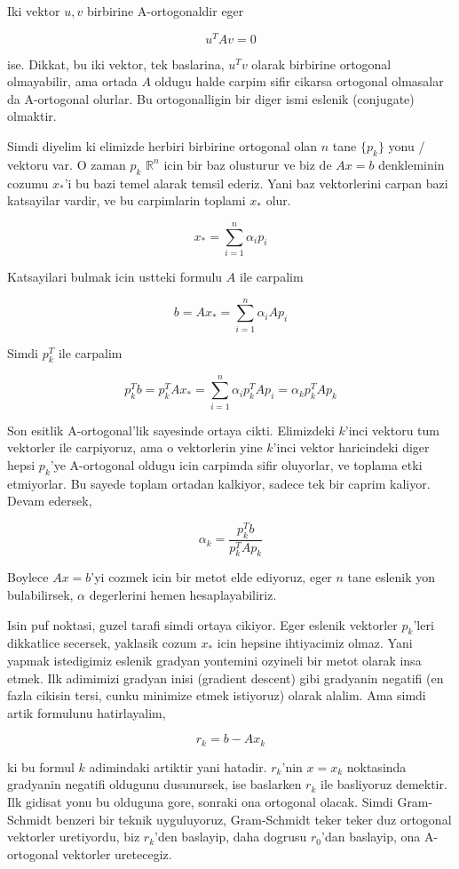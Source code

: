 \documentclass[12pt,fleqn]{article}\usepackage{../common}
\begin{document}
Iki vektor $u,v$ birbirine A-ortogonaldir eger

\[ u^TAv = 0 \] 

ise. Dikkat, bu iki vektor, tek baslarina, $u^Tv$ olarak birbirine
ortogonal olmayabilir, ama ortada $A$ oldugu halde carpim sifir cikarsa
ortogonal olmasalar da A-ortogonal olurlar. Bu ortogonalligin bir diger
ismi eslenik (conjugate) olmaktir.

Simdi diyelim ki elimizde herbiri birbirine ortogonal olan $n$ tane
$\{p_k\}$ yonu / vektoru var. O zaman $p_k$ $\mathbb{R}^n$ icin bir baz
olusturur ve biz de $Ax = b$ denkleminin cozumu $x_*$'i bu bazi temel
alarak temsil ederiz. Yani baz vektorlerini carpan bazi katsayilar vardir,
ve bu carpimlarin toplami $x_*$ olur. 

\[ x_* = \sum _{ i=1}^{n} \alpha_i p_i \]

Katsayilari bulmak icin ustteki formulu $A$ ile carpalim

\[ b = A x_* = \sum _{ i=1}^{n} \alpha_i A p_i \]

Simdi $p_k^T$ ile carpalim

\[
p_k^Tb = p_k^TA x_* = 
\sum _{ i=1}^{n} \alpha_i p_k^T A p_i = 
\alpha_k p_k^T A p_k \]

Son esitlik A-ortogonal'lik sayesinde ortaya cikti. Elimizdeki $k$'inci
vektoru tum vektorler ile carpiyoruz, ama o vektorlerin yine $k$'inci
vektor haricindeki diger hepsi $p_k$'ye A-ortogonal oldugu icin carpimda
sifir oluyorlar, ve toplama etki etmiyorlar. Bu sayede toplam ortadan
kalkiyor, sadece tek bir caprim kaliyor. Devam edersek,

\[ \alpha_k = \frac{p_k^Tb}{p_k^T A p_k} \]

Boylece $Ax = b$'yi cozmek icin bir metot elde ediyoruz, eger $n$ tane
eslenik yon bulabilirsek, $\alpha$ degerlerini hemen hesaplayabiliriz. 

Isin puf noktasi, guzel tarafi simdi ortaya cikiyor. Eger eslenik vektorler
$p_k$'leri dikkatlice secersek, yaklasik cozum $x_*$ icin hepsine
ihtiyacimiz olmaz. Yani yapmak istedigimiz eslenik gradyan yontemini
ozyineli bir metot olarak insa etmek. Ilk adimimizi gradyan inisi (gradient
descent) gibi gradyanin negatifi (en fazla cikisin tersi, cunku minimize
etmek istiyoruz) olarak alalim. Ama simdi artik formulunu hatirlayalim,

\[ r_k = b - Ax_k \]

ki bu formul $k$ adimindaki artiktir yani hatadir. $r_k$'nin $x = x_k$
noktasinda gradyanin negatifi oldugunu dusunursek, ise baslarken $r_k$ ile
basliyoruz demektir. Ilk gidisat yonu bu olduguna gore, sonraki ona
ortogonal olacak. Simdi Gram-Schmidt benzeri bir teknik uyguluyoruz,
Gram-Schmidt teker teker duz ortogonal vektorler uretiyordu, biz $r_k$'den
baslayip, daha dogrusu $r_0$'dan baslayip, ona A-ortogonal vektorler
uretecegiz. 
\end{document}
